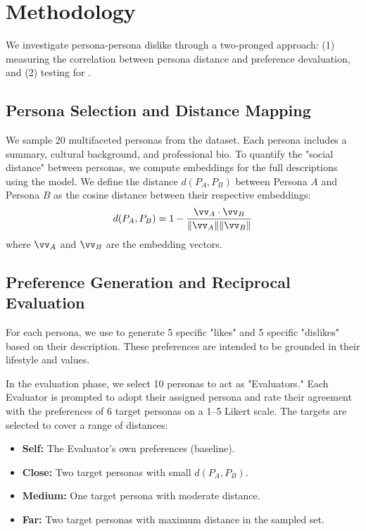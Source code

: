 \section{Methodology}

We investigate persona-persona dislike through a two-pronged approach: (1) measuring the correlation between persona distance and preference devaluation, and (2) testing for \schismogenesis.

\subsection{Persona Selection and Distance Mapping}

We sample 20 multifaceted personas from the \dataset dataset. Each persona includes a summary, cultural background, and professional bio. To quantify the "social distance" between personas, we compute embeddings for the full descriptions using the \embeddingmodel model. We define the distance $d(P_A, P_B)$ between Persona $A$ and Persona $B$ as the cosine distance between their respective embeddings:
\begin{equation}
    d(P_A, P_B) = 1 - \frac{\vv_A \cdot \vv_B}{\|\vv_A\| \|\vv_B\|}
\end{equation}
where $\vv_A$ and $\vv_B$ are the embedding vectors.

\subsection{Preference Generation and Reciprocal Evaluation}

For each persona, we use \gpt to generate 5 specific "likes" and 5 specific "dislikes" based on their description. These preferences are intended to be grounded in their lifestyle and values.

In the evaluation phase, we select 10 personas to act as "Evaluators." Each Evaluator is prompted to adopt their assigned persona and rate their agreement with the preferences of 6 target personas on a 1--5 Likert scale. The targets are selected to cover a range of distances:
\begin{itemize}[leftmargin=*,itemsep=0pt,topsep=0pt]
    \item {\bf Self:} The Evaluator's own preferences (baseline).
    \item {\bf Close:} Two target personas with small $d(P_A, P_B)$.
    \item {\bf Medium:} One target persona with moderate distance.
    \item {\bf Far:} Two target personas with maximum distance in the sampled set.
\end{itemize}

